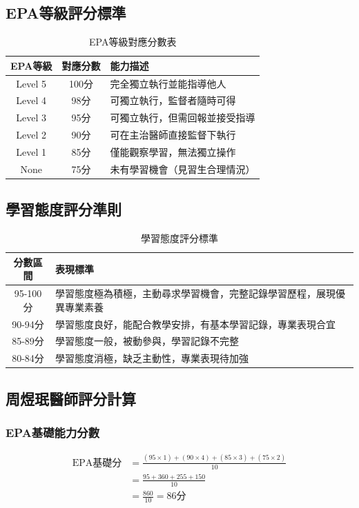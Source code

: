 \documentclass[12pt,a4paper]{article}
\begin{document}
\subsection{EPA等級評分標準}

\begin{table}[h]
\centering
\caption{EPA等級對應分數表}
\begin{tabular}{|c|c|p{8cm}|}
\hline
\textbf{EPA等級} & \textbf{對應分數} & \textbf{能力描述} \\
\hline
Level 5 & 100分 & 完全獨立執行並能指導他人 \\
\hline
Level 4 & 98分 & 可獨立執行，監督者隨時可得 \\
\hline
Level 3 & 95分 & 可獨立執行，但需回報並接受指導 \\
\hline
Level 2 & 90分 & 可在主治醫師直接監督下執行 \\
\hline
Level 1 & 85分 & 僅能觀察學習，無法獨立操作 \\
\hline
None & 75分 & 未有學習機會（見習生合理情況）\\
\hline
\end{tabular}
\end{table}

\subsection{學習態度評分準則}

\begin{table}[h]
\centering
\caption{學習態度評分標準}
\begin{tabular}{|c|p{10cm}|}
\hline
\textbf{分數區間} & \textbf{表現標準} \\
\hline
95-100分 & 學習態度極為積極，主動尋求學習機會，完整記錄學習歷程，展現優異專業素養 \\
\hline
90-94分 & 學習態度良好，能配合教學安排，有基本學習記錄，專業表現合宜 \\
\hline
85-89分 & 學習態度一般，被動參與，學習記錄不完整 \\
\hline
80-84分 & 學習態度消極，缺乏主動性，專業表現待加強 \\
\hline
\end{tabular}
\end{table}

\subsection{周煜珉醫師評分計算}

\subsubsection{EPA基礎能力分數}
\begin{align}
\text{EPA基礎分} &= \frac{(95 \times 1) + (90 \times 4) + (85 \times 3) + (75 \times 2)}{10}\\
&= \frac{95 + 360 + 255 + 150}{10}\\
&= \frac{860}{10} = 86\text{分}
\end{align}
\end{document}
